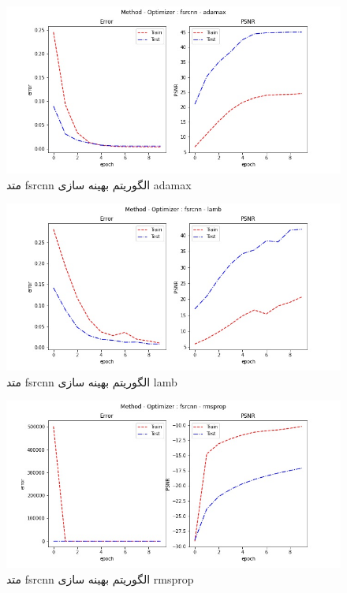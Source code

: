  \begin{figure}[!h] 
       \centering 
       \includegraphics[width=160mm]{./chapter3/images/error-psnr-fsrcnn-adamax.jpg}
       \caption{متد fsrcnn الگوریتم بهینه سازی adamax}
       \label{fig:error-psnr-fsrcnn-adamax}
 \end{figure}
 \begin{figure}[!h] 
       \centering 
       \includegraphics[width=160mm]{./chapter3/images/error-psnr-fsrcnn-lamb.jpg}
       \caption{متد fsrcnn الگوریتم بهینه سازی lamb}
       \label{fig:error-psnr-fsrcnn-lamb}
 \end{figure}
 \begin{figure}[!h] 
       \centering 
       \includegraphics[width=160mm]{./chapter3/images/error-psnr-fsrcnn-rmsprop.jpg}
       \caption{متد fsrcnn الگوریتم بهینه سازی rmsprop}
       \label{fig:error-psnr-fsrcnn-rmsprop}
 \end{figure}
